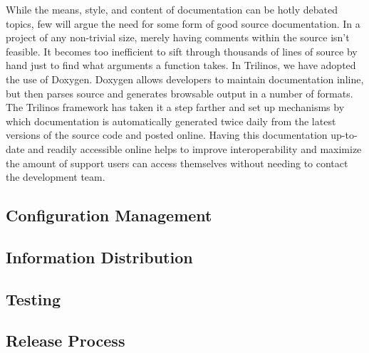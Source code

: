 \documentclass[12pt,relax]{article}
\begin{document}

While the means, style, and content of documentation can be hotly debated
topics, few will argue the need for some form of good source documentation.
In a project of any non-trivial size, merely having comments within the source
isn't feasible.  It becomes too inefficient to sift through thousands of lines
of source by hand just to find what arguments a function takes.  In Trilinos,
we have adopted the use of Doxygen.  Doxygen allows developers to maintain
documentation inline, but then parses source and generates browsable output in
a number of formats.  The Trilinos framework has taken it a step farther and
set up mechanisms by which documentation is automatically generated twice daily
from the latest versions of the source code and posted online.  Having this
documentation up-to-date and readily accessible online helps to improve
interoperability and maximize the amount of support users can access
themselves without needing to contact the development team.

\subsection{Configuration Management}


\subsection{Information Distribution}


\subsection{Testing}




\subsection{Release Process}


\clearpage
\end{document}
